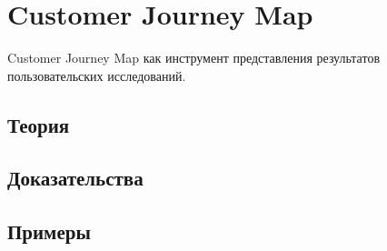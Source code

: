 
\section{Customer Journey Map}
\label{sec:2.6.14-customer-journey-map}

\begin{ticket}
Customer Journey Map как инструмент представления результатов пользовательских исследований.
\end{ticket}

\subsection*{Теория}

\subsection*{Доказательства}

\subsection*{Примеры}
